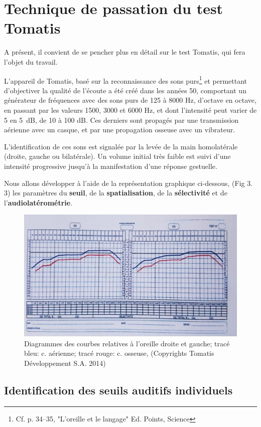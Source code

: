 \section{Technique de passation du test Tomatis}
A présent, il convient de se pencher plus en détail sur le test
Tomatis, qui fera l'objet du travail.

L'appareil de Tomatis, basé sur la reconnaissance des sons purs\footnote{Cf. p. 34--35, "L'oreille et le langage" Ed. Points, Science} et
permettant d'objectiver la qualité de l'écoute
 a été créé dans les années 50, comportant un générateur de fréquences
 avec
 des sons
  purs de 125 à 8000 Hz, d'octave en octave, en passant par les valeurs
1500, 3000 et 6000 Hz, et dont l'intensité peut varier de 5 en \SI{5}{\dB}, de 10 à 100 dB.
Ces derniers sont propagés par une
  transmission aérienne avec un casque, et par une propagation osseuse
  avec un vibrateur.

  L'identification de ces sons est
  signalée par la levée de la main homolatérale (droite, gauche ou
  bilatérale).
Un volume initial très faible est suivi d'une intensité
progressive jusqu'à la manifestation d'une réponse gestuelle.

Nous allons développer à l'aide de la représentation
graphique ci-dessous, (Fig 3. 3) les paramètres du\textbf{ seuil}, de la
\textbf{spatialisation}, de la \textbf{sélectivité} et de l'\textbf{au\-dio\-latérométrie}.


\begin{figure}
	\centering
	\includegraphics[width=0.7\linewidth]{images/courbeideale.jpg}
	\caption{Diagrammes des courbes relatives à l'oreille droite et
          gauche; tracé bleu: c. aérienne; tracé rouge: c.
          osseuse, (Copyrights Tomatis Développement S.A.  2014) }
	\label{fig:courbeideale}
\end{figure}




\subsection{Identification des seuils auditifs individuels}

